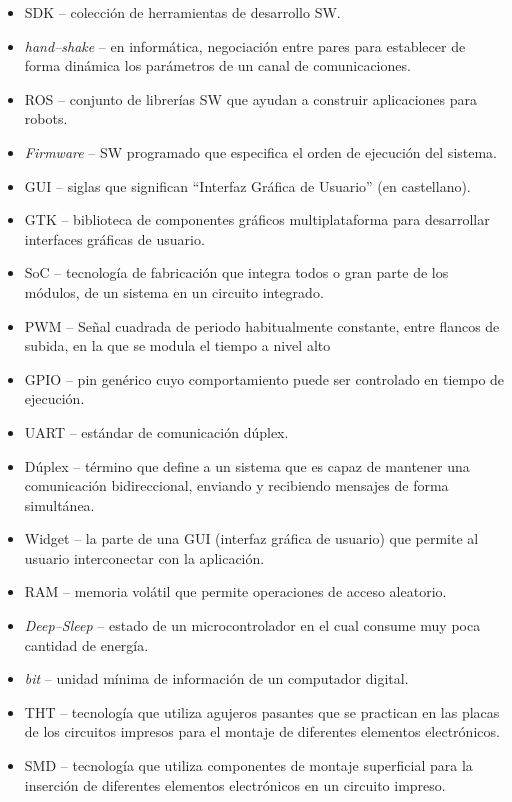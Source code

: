 \begin{itemize}
    \item \ac{SDK} -- colección de herramientas de desarrollo \ac{SW}.
    \item \textit{hand--shake} -- en informática, negociación entre pares para establecer de forma dinámica los parámetros de un canal de comunicaciones. 
    \item \ac{ROS} -- conjunto de librerías \ac{SW} que ayudan a construir aplicaciones para robots.
    \item \textit{Firmware} -- \ac{SW} programado que especifica el orden de ejecución del sistema.
    \item \ac{GUI} -- siglas que significan ``Interfaz Gráfica de Usuario'' (en castellano).
    \item \ac{GTK} -- biblioteca de componentes gráficos multiplataforma para desarrollar interfaces gráficas de usuario.
    \item \ac{SoC} -- tecnología de fabricación que integra todos o gran parte de los módulos, de un sistema en un circuito integrado. 
    \item \ac{PWM} -- Señal cuadrada de periodo habitualmente constante, entre flancos de subida, en la que se modula el tiempo a nivel alto
    \item \ac{GPIO} -- pin genérico cuyo comportamiento puede ser controlado en tiempo de ejecución.
    \item \ac{UART} -- estándar de comunicación dúplex.
    \item Dúplex -- término que define a un sistema que es capaz de mantener una comunicación bidireccional, enviando y recibiendo mensajes de forma simultánea.
    \item Widget -- la parte de una GUI (interfaz gráfica de usuario) que permite al usuario interconectar con la aplicación.
    \item \ac{RAM} -- memoria volátil que permite operaciones de acceso aleatorio.
    \item \textit{Deep--Sleep} -- estado de un microcontrolador en el cual consume muy poca cantidad de energía.
    \item \textit{bit} -- unidad mínima de información de un computador digital.
    \item \ac{THT} -- tecnología que utiliza agujeros pasantes que se practican en las placas de los circuitos impresos para el montaje de diferentes elementos electrónicos.
    \item \ac{SMD} -- tecnología que utiliza componentes de montaje superficial para la inserción de diferentes elementos electrónicos en un circuito impreso.
\end{itemize}
